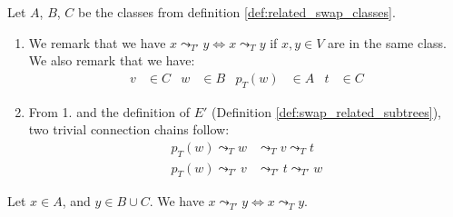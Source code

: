 \begin{remark}
    \label{rem:related_swap_classes}
    Let $A$, $B$, $C$ be the classes from definition \ref{def:related_swap_classes}. 
    \begin{enumerate}
        \item We remark that we have $x \leadsto_{T'} y \Leftrightarrow x \leadsto_T y$ if $x, y \in V$ are in the same class. We also remark that we have:
        \begin{align*}
            v &\in C & w &\in B & p_T(w) &\in A & t &\in C
        \end{align*}
        \item From 1. and the definition of $E'$ (Definition \ref{def:swap_related_subtrees}), two trivial connection chains follow:
        \begin{align*}
            p_T(w) \leadsto_T w &\leadsto_T v \leadsto _T t \\
            p_T(w) \leadsto_{T'} v &\leadsto_{T'} t \leadsto_{T'} w
        \end{align*}
    \end{enumerate}
\end{remark}

\begin{lemma}
    \label{lem:related_swap_abc}
    Let $x \in A$, and $y \in B \cup C$. We have $x \leadsto_{T'} y \Leftrightarrow x \leadsto_T y$.
\end{lemma}

